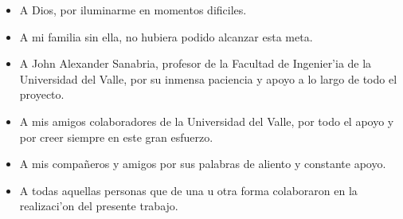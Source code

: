 
\begin{itemize}
\item A Dios, por iluminarme en momentos dificiles.
\item A mi familia sin ella, no hubiera podido alcanzar esta meta.
\item A John Alexander Sanabria, profesor de la Facultad de Ingenier'ia de la Universidad del Valle, por su inmensa paciencia y apoyo a lo largo de todo el proyecto.
\item A mis amigos colaboradores de la Universidad del Valle, por todo el apoyo y por creer siempre en este gran esfuerzo.
\item A mis compañeros y amigos por sus palabras de aliento y constante apoyo.
\item A todas aquellas personas que de una u otra forma colaboraron en la realizaci'on del presente trabajo.
\end{itemize}

